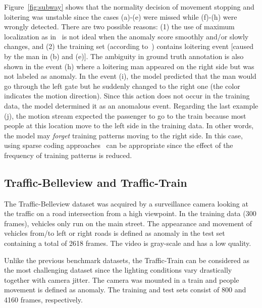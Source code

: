 \documentclass[10pt,twocolumn,letterpaper]{article}
\begin{document}
Figure~\ref{fig:subway} shows that the normality decision of movement stopping and loitering was unstable since the cases (a)-(e) were missed while (f)-(h) were wrongly detected. There are two possible reasons: (1) the use of maximum localization as in~\cite{Hasan2016Learning} is not ideal when the anomaly score smoothly and/or slowly changes, and (2) the training set (according to~\cite{Kim2009Observe}) contains loitering event [caused by the man in (b) and (e)]. The ambiguity in ground truth annotation is also shown in the event (h) where a loitering man appeared on the right side but was not labeled as anomaly. In the event (i), the model predicted that the man would go through the left gate but he suddenly changed to the right one (the color indicates the motion direction). Since this action does not occur in the training data, the model determined it as an anomalous event. Regarding the last example (j), the motion stream expected the passenger to go to the train because most people at this location move to the left side in the training data. In other words, the model may \textit{forget} training patterns moving to the right side. In this case, using sparse coding approaches~\cite{Kim2009Observe,Zhao2011Online,Lu2013Abnormal} can be appropriate since the effect of the frequency of training patterns is reduced.

\subsection{Traffic-Belleview and Traffic-Train}
The Traffic-Belleview dataset was acquired by a surveillance camera looking at the traffic on a road intersection from a high viewpoint. In the training data (300 frames), vehicles only run on the main street. The appearance and movement of vehicles from/to left or right roads is defined as anomaly in the test set containing a total of 2618 frames. The video is gray-scale and has a low quality.

Unlike the previous benchmark datasets, the Traffic-Train can be considered as the most challenging dataset since the lighting conditions vary drastically together with camera jitter. The camera was mounted in a train and people movement is defined as anomaly. The training and test sets consist of 800 and 4160 frames, respectively.
\end{document}
